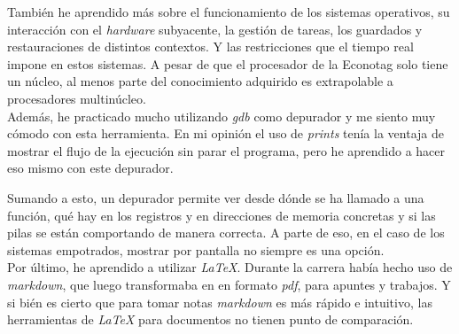 También he aprendido más sobre el funcionamiento de los sistemas operativos, su interacción con el \emph{hardware} subyacente, la gestión de tareas, los guardados y restauraciones de distintos contextos. Y las restricciones que el tiempo real impone en estos sistemas. A pesar de que el procesador de la Econotag solo tiene un núcleo, al menos parte del conocimiento adquirido es extrapolable a procesadores multinúcleo.\\

Además, he practicado mucho utilizando \emph{gdb} como depurador y me siento muy cómodo con esta herramienta. En mi opinión el uso de \emph{prints} tenía la ventaja de mostrar el flujo de la ejecución sin parar el programa, pero he aprendido a hacer eso mismo con este depurador. 

Sumando a esto, un depurador permite ver desde dónde se ha llamado a una función, qué hay en los registros y en direcciones de memoria concretas y si las pilas se están comportando de manera correcta.
A parte de eso, en el caso de los sistemas empotrados, mostrar por pantalla no siempre es una opción.\\

Por último, he aprendido a utilizar \emph{LaTeX}. Durante la carrera había hecho uso de \emph{markdown}, que luego transformaba en en formato \emph{pdf}, para apuntes y trabajos. Y si bién es cierto que para tomar notas \emph{markdown} es más rápido e intuitivo, las herramientas de \emph{LaTeX} para documentos no tienen punto de comparación.

